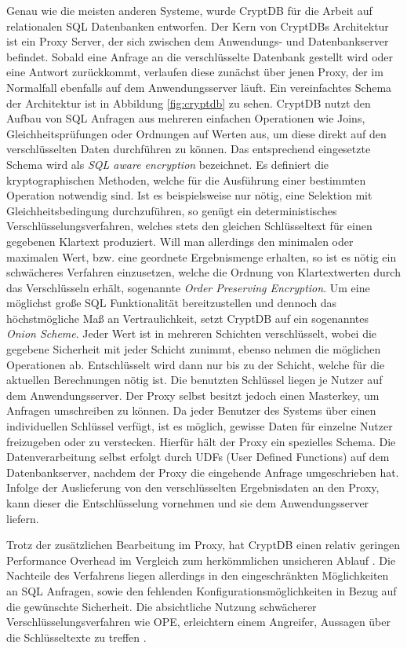 Genau wie die meisten anderen Systeme, wurde CryptDB \cite{Popa2011}\cite{Popa2012} für die Arbeit auf relationalen SQL Datenbanken entworfen. Der Kern von CryptDBs Architektur ist ein Proxy Server, der sich zwischen dem Anwendungs- und  Datenbankserver befindet. Sobald eine Anfrage an die verschlüsselte Datenbank gestellt wird oder eine Antwort zurückkommt, verlaufen diese zunächst über jenen Proxy, der im Normalfall ebenfalls auf dem Anwendungsserver läuft. Ein vereinfachtes Schema der Architektur ist in Abbildung \ref{fig:cryptdb} zu sehen. CryptDB nutzt den Aufbau von SQL Anfragen aus mehreren einfachen Operationen wie Joins, Gleichheitsprüfungen oder Ordnungen auf Werten aus, um diese direkt auf den verschlüsselten Daten durchführen zu können. Das entsprechend eingesetzte Schema wird als \textit{SQL aware encryption} bezeichnet. Es definiert die kryptographischen Methoden, welche für die Ausführung einer bestimmten Operation notwendig sind. Ist es beispielsweise nur nötig, eine Selektion mit Gleichheitsbedingung durchzuführen, so genügt ein deterministisches Verschlüsselungsverfahren, welches stets den gleichen Schlüsseltext für einen gegebenen Klartext produziert. Will man allerdings den minimalen oder maximalen Wert, bzw. eine geordnete Ergebnismenge erhalten, so ist es nötig ein schwächeres Verfahren einzusetzen, welche die Ordnung von Klartextwerten durch das Verschlüsseln erhält, sogenannte \textit{Order Preserving Encryption}. Um eine möglichst große SQL Funktionalität bereitzustellen und dennoch das höchstmögliche Maß an Vertraulichkeit, setzt CryptDB auf ein sogenanntes \textit{Onion Scheme}. Jeder Wert ist in mehreren Schichten verschlüsselt, wobei die gegebene Sicherheit mit jeder Schicht zunimmt, ebenso nehmen die möglichen Operationen ab. Entschlüsselt wird dann nur bis zu der Schicht, welche für die aktuellen Berechnungen nötig ist. Die benutzten Schlüssel liegen je Nutzer auf dem Anwendungsserver. Der Proxy selbst besitzt jedoch einen Masterkey, um Anfragen umschreiben zu können. Da jeder Benutzer des Systems über einen individuellen Schlüssel verfügt, ist es möglich, gewisse Daten für einzelne Nutzer freizugeben oder zu verstecken. Hierfür hält der Proxy ein spezielles Schema. Die Datenverarbeitung selbst erfolgt durch UDFs (User Defined Functions) auf dem Datenbankserver, nachdem der Proxy die eingehende Anfrage umgeschrieben hat. Infolge der Auslieferung von den verschlüsselten Ergebnisdaten an den Proxy, kann dieser die Entschlüsselung vornehmen und sie dem Anwendungsserver liefern.

Trotz der zusätzlichen Bearbeitung im Proxy, hat CryptDB einen relativ geringen Performance Overhead im Vergleich zum herkömmlichen unsicheren Ablauf \cite{Popa2012}. Die Nachteile des Verfahrens liegen allerdings in den eingeschränkten Möglichkeiten an SQL Anfragen, sowie den fehlenden Konfigurationsmöglichkeiten in Bezug auf die gewünschte Sicherheit. Die absichtliche Nutzung schwächerer Verschlüsselungsverfahren wie OPE, erleichtern einem Angreifer, Aussagen über die Schlüsseltexte zu treffen \cite{Poddar2016}.

